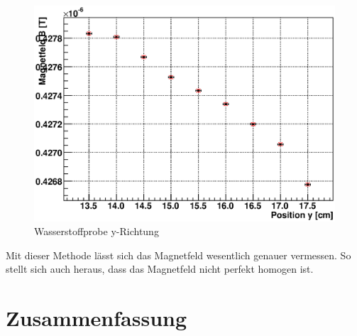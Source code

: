 \documentclass[12pt]{article}
\begin{document}
\begin{figure}[H]
\centering
\includegraphics[width=0.9\linewidth]{pictures/wasser_y.eps}
\caption{Wasserstoffprobe y-Richtung}
\end{figure}

Mit dieser Methode lässt sich das Magnetfeld wesentlich genauer vermessen. So stellt sich auch heraus, dass das Magnetfeld nicht perfekt homogen ist.

\section{Zusammenfassung}
\end{document}
